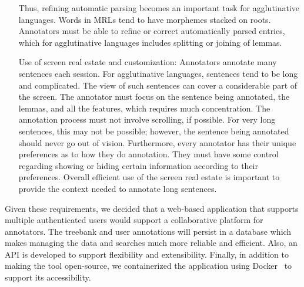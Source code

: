 \begin{itemize}[before=\normalfont, font=\itshape, align=left,noitemsep,topsep=0pt,parsep=3pt,partopsep=0pt,labelsep=3pt,align=left]
        Thus, refining automatic parsing becomes an important task for agglutinative languages.
        Words in MRLs tend to have morphemes stacked on roots.
        Annotators must be able to refine or correct automatically parsed entries, which for agglutinative languages includes splitting or joining of lemmas.
    \item[Use of screen real estate and customization:] %
        Annotators annotate many sentences each session.
        For agglutinative languages, sentences tend to be long and complicated.
        The view of such sentences can cover a considerable part of the screen.
        The annotator must focus on the sentence being annotated, the lemmas, and all the features, which requires much concentration.
        The annotation process must not involve scrolling, if possible.
        For very long sentences, this may not be possible; however, the sentence being annotated should never go out of vision.
        Furthermore, every annotator has their unique preferences as to how they do annotation.
        They must have some control regarding showing or hiding certain information according to their preferences.
        Overall efficient use of the screen real estate is important to provide the context needed to annotate long sentences.
\end{itemize}

Given these requirements, we decided that a web-based application that supports multiple authenticated users would support a collaborative platform for annotators.
The treebank and user annotations will persist in a database which makes managing the data and searches much more reliable and efficient.
Also, an API is developed to support flexibility and extensibility.
Finally, in addition to making the tool open-source, we containerized the application using Docker~\cite{docker} to support its accessibility.

